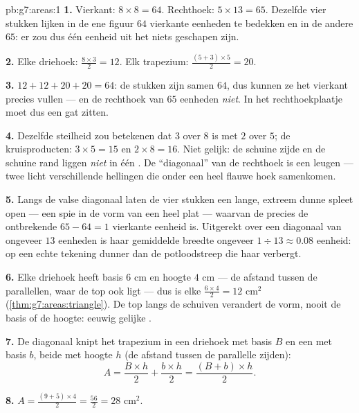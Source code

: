 \begin{solution}{pb:g7:areas:1}
\textbf{1.} Vierkant: $8 \times 8 = 64$. Rechthoek: $5 \times 13 = 65$. Dezelfde vier
stukken lijken in de ene figuur $64$ vierkante eenheden te bedekken en in de andere
$65$: er zou dus één eenheid  uit het niets geschapen zijn.

\textbf{2.} Elke driehoek: $\frac{8 \times 3}{2} = 12$. Elk trapezium:
$\frac{(5 + 3) \times 5}{2} = 20$.

\textbf{3.} $12 + 12 + 20 + 20 = 64$: de stukken zijn samen $64$, dus kunnen ze het
vierkant precies vullen --- en de rechthoek van $65$ eenheden \emph{niet}. In het
rechthoekplaatje moet dus een gat zitten.

\textbf{4.} Dezelfde steilheid zou betekenen dat $3$ over $8$  is met $2$
over $5$; de kruisproducten: $3 \times 5 = 15$ en $2 \times 8 = 16$. Niet gelijk: de
schuine zijde en de schuine rand liggen \emph{niet} in één . De ``diagonaal'' van
de rechthoek is een leugen --- twee licht verschillende hellingen die onder een heel
flauwe hoek samenkomen.

\textbf{5.} Langs de valse diagonaal laten de vier stukken een lange, extreem dunne
spleet open --- een spie in de vorm van een heel plat  --- waarvan de
 precies de ontbrekende $65 - 64 = 1$ vierkante eenheid is. Uitgerekt over
een diagonaal van ongeveer $13$ eenheden is haar gemiddelde breedte ongeveer
$1 \div 13 \approx 0.08$ eenheid: op een echte tekening dunner dan de potloodstreep
die haar verbergt.

\textbf{6.} Elke driehoek heeft basis $6$ cm en hoogte $4$ cm --- de afstand tussen de
parallellen, waar de top ook ligt --- dus is elke 
$\frac{6 \times 4}{2} = 12$ cm$^2$ (\cref{thm:g7:areas:triangle}). De top langs de
 schuiven verandert de vorm, nooit de basis of de hoogte: eeuwig gelijke
.

\textbf{7.} De diagonaal knipt het trapezium in een driehoek met basis $B$ en een met
basis $b$, beide met hoogte $h$ (de afstand tussen de parallelle zijden):
\[
A = \frac{B \times h}{2} + \frac{b \times h}{2}
= \frac{(B + b) \times h}{2} .
\]

\textbf{8.} $A = \frac{(9 + 5) \times 4}{2} = \frac{56}{2} = 28$ cm$^2$.


\end{solution}
